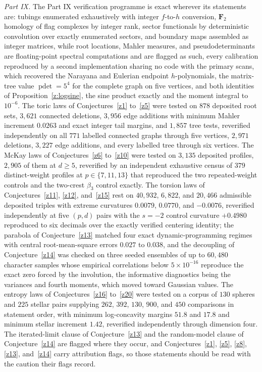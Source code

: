 \documentclass[11pt]{article}
\theoremstyle{definition}
\begin{document}
\emph{Part IX.}  The Part IX verification programme is exact wherever its statements are: tubings enumerated exhaustively with integer $f$-to-$h$ conversion, $\mathbf F_2$ homology of flag complexes by integer rank, sector functionals by deterministic convolution over exactly enumerated sectors, and boundary maps assembled as integer matrices, while root locations, Mahler measures, and pseudodeterminants are floating-point spectral computations and are flagged as such, every calibration reproduced by a second implementation sharing no code with the primary scans, which recovered the Narayana and Eulerian endpoint $h$-polynomials, the matrix-tree value $\operatorname{pdet}=5^4$ for the complete graph on five vertices, and both identities of Proposition~\ref{z:logsine}, the sine product exactly and the moment integral to $10^{-6}$.  The toric laws of Conjectures~\ref{z1} to~\ref{z5} were tested on $878$ deposited root sets, $3{,}621$ connected deletions, $3{,}956$ edge additions with minimum Mahler increment $0.0263$ and exact integer tail margins, and $1{,}857$ tree tests, reverified independently on all $771$ labelled connected graphs through five vertices, $2{,}971$ deletions, $3{,}227$ edge additions, and every labelled tree through six vertices.  The McKay laws of Conjectures~\ref{z6} to~\ref{z10} were tested on $3{,}135$ deposited profiles, $2{,}905$ of them at $d\ge5$, reverified by an independent exhaustive census of $379$ distinct-weight profiles at $p\in\{7,11,13\}$ that reproduced the two repeated-weight controls and the two-crest $\beta_3$ control exactly.  The torsion laws of Conjectures~\ref{z11}, \ref{z12}, and~\ref{z15} rest on $40{,}932$, $6{,}822$, and $20{,}466$ admissible deposited triples with extreme curvatures $0.0079$, $0.0770$, and $-0.0076$, reverified independently at five $(p,d)$ pairs with the $s=-2$ control curvature $+0.4980$ reproduced to six decimals over the exactly verified centering identity; the parabola of Conjecture~\ref{z13} matched four exact dynamic-programming regimes with central root-mean-square errors $0.027$ to $0.038$, and the decoupling of Conjecture~\ref{z14} was checked on three seeded ensembles of up to $60{,}480$ character samples whose empirical correlations below $5\times10^{-16}$ reproduce the exact zero forced by the involution, the informative diagnostics being the variances and fourth moments, which moved toward Gaussian values.  The entropy laws of Conjectures~\ref{z16} to~\ref{z20} were tested on a corpus of $130$ spheres and $225$ stellar pairs supplying $262$, $392$, $130$, $900$, and $450$ comparisons in statement order, with minimum log-concavity margins $51.8$ and $17.8$ and minimum stellar increment $1.42$, reverified independently through dimension four.  The iterated-limit clause of Conjecture~\ref{z13} and the random-model clause of Conjecture~\ref{z14} are flagged where they occur, and Conjectures~\ref{z1}, \ref{z5}, \ref{z8}, \ref{z13}, and~\ref{z14} carry attribution flags, so those statements should be read with the caution their flags record.
\end{document}
